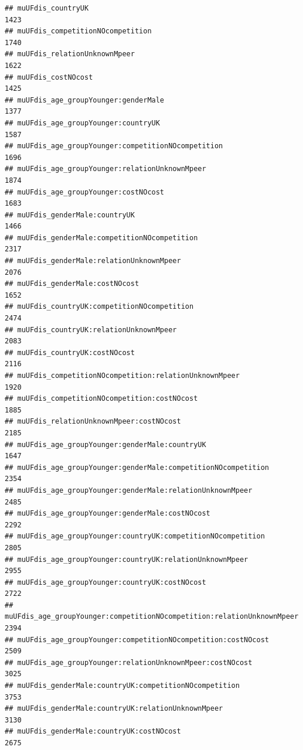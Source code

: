 \documentclass[
]{article}
\begin{document}
\begin{verbatim}
## muUFdis_countryUK                                                          1423
## muUFdis_competitionNOcompetition                                           1740
## muUFdis_relationUnknownMpeer                                               1622
## muUFdis_costNOcost                                                         1425
## muUFdis_age_groupYounger:genderMale                                        1377
## muUFdis_age_groupYounger:countryUK                                         1587
## muUFdis_age_groupYounger:competitionNOcompetition                          1696
## muUFdis_age_groupYounger:relationUnknownMpeer                              1874
## muUFdis_age_groupYounger:costNOcost                                        1683
## muUFdis_genderMale:countryUK                                               1466
## muUFdis_genderMale:competitionNOcompetition                                2317
## muUFdis_genderMale:relationUnknownMpeer                                    2076
## muUFdis_genderMale:costNOcost                                              1652
## muUFdis_countryUK:competitionNOcompetition                                 2474
## muUFdis_countryUK:relationUnknownMpeer                                     2083
## muUFdis_countryUK:costNOcost                                               2116
## muUFdis_competitionNOcompetition:relationUnknownMpeer                      1920
## muUFdis_competitionNOcompetition:costNOcost                                1885
## muUFdis_relationUnknownMpeer:costNOcost                                    2185
## muUFdis_age_groupYounger:genderMale:countryUK                              1647
## muUFdis_age_groupYounger:genderMale:competitionNOcompetition               2354
## muUFdis_age_groupYounger:genderMale:relationUnknownMpeer                   2485
## muUFdis_age_groupYounger:genderMale:costNOcost                             2292
## muUFdis_age_groupYounger:countryUK:competitionNOcompetition                2805
## muUFdis_age_groupYounger:countryUK:relationUnknownMpeer                    2955
## muUFdis_age_groupYounger:countryUK:costNOcost                              2722
## muUFdis_age_groupYounger:competitionNOcompetition:relationUnknownMpeer     2394
## muUFdis_age_groupYounger:competitionNOcompetition:costNOcost               2509
## muUFdis_age_groupYounger:relationUnknownMpeer:costNOcost                   3025
## muUFdis_genderMale:countryUK:competitionNOcompetition                      3753
## muUFdis_genderMale:countryUK:relationUnknownMpeer                          3130
## muUFdis_genderMale:countryUK:costNOcost                                    2675

\end{verbatim}
\end{document}
